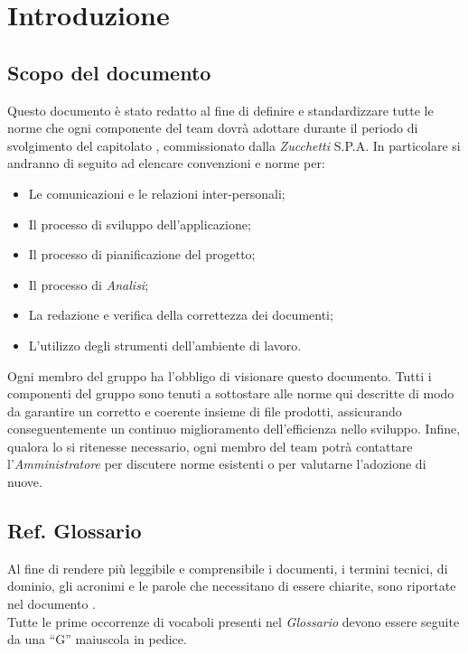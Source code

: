 \section{Introduzione}

\subsection{Scopo del documento}
Questo documento è stato redatto al fine di definire e standardizzare tutte le norme che ogni componente del team \gruppo{} dovrà adottare durante il periodo di svolgimento del capitolato \progetto, commissionato dalla \textit{Zucchetti} S.P.A. In particolare si andranno di seguito ad elencare convenzioni e norme per:
\begin{itemize}
\item Le comunicazioni e le relazioni inter-personali;
\item Il processo di sviluppo dell'applicazione;
\item Il processo di pianificazione del progetto;
\item Il processo di \textit{Analisi};
\item La redazione e verifica della correttezza dei documenti;
\item L'utilizzo degli strumenti dell'ambiente di lavoro.
\end{itemize}

Ogni membro del gruppo \gruppo{} ha l'obbligo di visionare questo documento.
Tutti i componenti del gruppo sono tenuti a sottostare alle norme qui descritte di modo da garantire un corretto e coerente insieme di file prodotti, assicurando conseguentemente un continuo miglioramento dell'efficienza nello sviluppo.
Infine, qualora lo si ritenesse necessario, ogni membro del team potrà contattare l'\textit{Amministratore} per discutere norme esistenti o per valutarne l'adozione di nuove.

\subsection{Ref. Glossario}
Al fine di rendere più leggibile e comprensibile i documenti, i termini tecnici, di dominio, gli acronimi e le parole che necessitano di essere chiarite, sono riportate nel documento \Glossario{}.\\
Tutte le prime occorrenze di vocaboli presenti nel \textit{Glossario} devono essere seguite da una ``G'' maiuscola in pedice.
